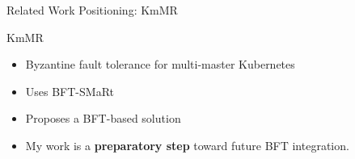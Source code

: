 \documentclass{beamer}
\begin{document}
\begin{frame}{Related Work Positioning: KmMR}
\begin{block}{KmMR}
\begin{itemize}
    \item Byzantine fault tolerance for multi-master Kubernetes
    \item Uses BFT-SMaRt
    \item Proposes a BFT-based solution
\end{itemize}
\end{block}

\begin{table}
\centering
\scriptsize
{}
\end{table}

\vspace{0.3cm}
\begin{itemize}
    \item My work is a \textbf{preparatory step} toward future BFT integration.
\end{itemize}
\end{frame}
\end{document}

